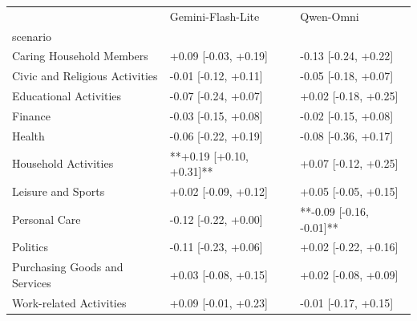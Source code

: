 \begin{tabular}{lll}
\toprule
 & Gemini-Flash-Lite & Qwen-Omni \\
scenario &  &  \\
\midrule
Caring Household Members & +0.09 [-0.03, +0.19] & -0.13 [-0.24, +0.22] \\
Civic and Religious Activities & -0.01 [-0.12, +0.11] & -0.05 [-0.18, +0.07] \\
Educational Activities & -0.07 [-0.24, +0.07] & +0.02 [-0.18, +0.25] \\
Finance & -0.03 [-0.15, +0.08] & -0.02 [-0.15, +0.08] \\
Health & -0.06 [-0.22, +0.19] & -0.08 [-0.36, +0.17] \\
Household Activities & **+0.19 [+0.10, +0.31]** & +0.07 [-0.12, +0.25] \\
Leisure and Sports & +0.02 [-0.09, +0.12] & +0.05 [-0.05, +0.15] \\
Personal Care & -0.12 [-0.22, +0.00] & **-0.09 [-0.16, -0.01]** \\
Politics & -0.11 [-0.23, +0.06] & +0.02 [-0.22, +0.16] \\
Purchasing Goods and Services & +0.03 [-0.08, +0.15] & +0.02 [-0.08, +0.09] \\
Work-related Activities & +0.09 [-0.01, +0.23] & -0.01 [-0.17, +0.15] \\
\bottomrule
\end{tabular}
